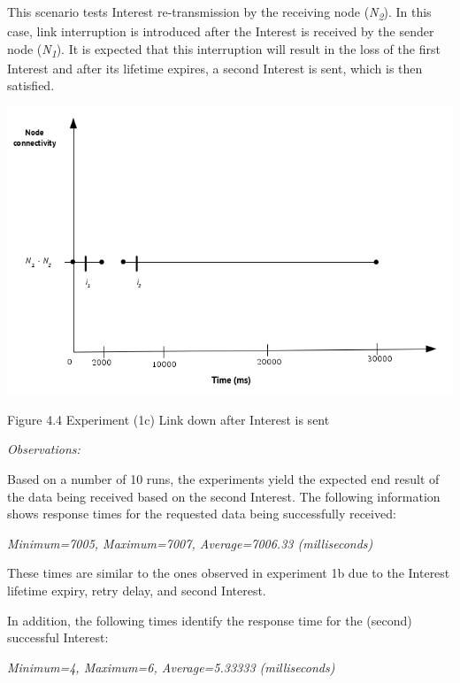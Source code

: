 \documentclass[a4paper,12pt]{report}      %
\begin{document}
This scenario tests Interest re-transmission by the receiving node (\emph{N\textsubscript{2}}). In this case, link interruption is introduced after the Interest is received by the sender node (\emph{N\textsubscript{1}}). It is expected that this interruption will result in the loss of the first Interest and after its lifetime expires, a second Interest is sent, which is then satisfied.

\noindent\includegraphics[scale=0.55]{exp1c_timediag.jpg}\newline
\begin{center}Figure 4.4 Experiment (1c) Link down after Interest is sent\end{center}

\vspace*{1\baselineskip}\noindent\emph{Observations:}

Based on a number of 10 runs, the experiments yield the expected end result of the data being received
based on the second Interest. The following information shows response times for the requested
data being successfully received:

\begin{center}\textsl{Minimum=7005, Maximum=7007, Average=7006.33 (milliseconds)}\end{center}

These times are similar to the ones observed in experiment 1b due to the Interest lifetime expiry,
retry delay, and second Interest.

In addition, the following times identify the response time for the (second) successful Interest:

\begin{center}\textsl{Minimum=4, Maximum=6, Average=5.33333 (milliseconds)}\end{center}
\end{document}
